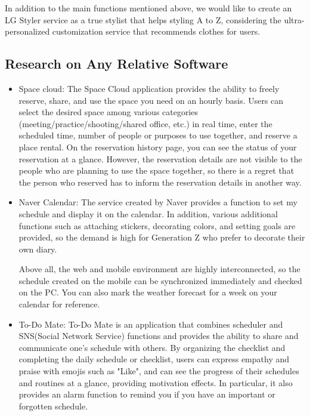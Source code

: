 \documentclass[conference]{IEEEtran}
\begin{document}
In addition to the main functions mentioned above, we would like to create an LG Styler service as a true stylist that helps styling A to Z, considering the ultra-personalized customization service that recommends clothes for users.\\

\subsection{Research on Any Relative Software}
\begin{itemize}
    \item Space cloud: The Space Cloud application provides the ability to freely reserve, share, and use the space you need on an hourly basis. Users can select the desired space among various categories (meeting/practice/shooting/shared office, etc.) in real time, enter the scheduled time, number of people or purposes to use together, and reserve a place rental. On the reservation history page, you can see the status of your reservation at a glance. However, the reservation details are not visible to the people who are planning to use the space together, so there is a regret that the person who reserved has to inform the reservation details in another way.
    
    \item Naver Calendar: The service created by Naver provides a function to set my schedule and display it on the calendar. In addition, various additional functions such as attaching stickers, decorating colors, and setting goals are provided, so the demand is high for Generation Z who prefer to decorate their own diary.
    
    Above all, the web and mobile environment are highly interconnected, so the schedule created on the mobile can be synchronized immediately and checked on the PC. You can also mark the weather forecast for a week on your calendar for reference.
    
    \item To-Do Mate: To-Do Mate is an application that combines scheduler and SNS(Social Network Service) functions and provides the ability to share and communicate one's schedule with others. By organizing the checklist and completing the daily schedule or checklist, users can express empathy and praise with emojis such as "Like", and can see the progress of their schedules and routines at a glance, providing motivation effects. In particular, it also provides an alarm function to remind you if you have an important or forgotten schedule.\\
\end{itemize}
\end{document}
